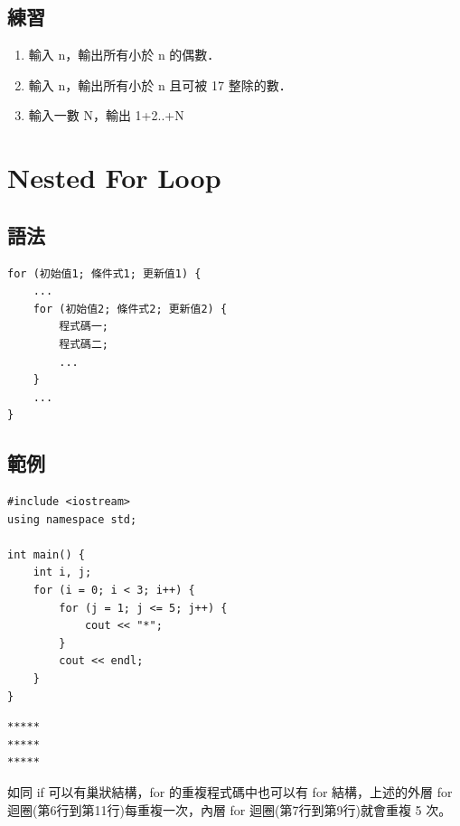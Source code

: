 \documentclass[a4paper,12pt]{article}
\begin{document}
\subsection{練習}
\label{sec:org10e17d3}
\begin{enumerate}
\item 輸入 n，輸出所有小於 n 的偶數．\\
\item 輸入 n，輸出所有小於 n 且可被 17 整除的數．\\
\item 輸入一數 N，輸出 1+2..+N\\
\end{enumerate}

\section{Nested For Loop}
\label{cpp_nested_for}
\subsection{語法}
\label{sec:org93131b2}
\lstset{breaklines=true,language=cpp,label= ,caption= ,captionpos=b,firstnumber=1,numbers=left}
\begin{lstlisting}
for (初始值1; 條件式1; 更新值1) {
    ...
    for (初始值2; 條件式2; 更新值2) {
        程式碼一;
        程式碼二;
        ...
    }
    ...
}
\end{lstlisting}
\subsection{範例}
\label{sec:org01c6e8f}
\lstset{breaklines=true,language=cpp,label= ,caption= ,captionpos=b,firstnumber=1,numbers=left}
\begin{lstlisting}
#include <iostream>
using namespace std;

int main() {
    int i, j;
    for (i = 0; i < 3; i++) {
        for (j = 1; j <= 5; j++) {
            cout << "*";
        }
        cout << endl;
    }
}
\end{lstlisting}

\begin{verbatim}
*****
*****
*****
\end{verbatim}


如同 if 可以有巢狀結構，for 的重複程式碼中也可以有 for 結構，上述的外層 for 迴圈(第6行到第11行)每重複一次，內層 for 迴圈(第7行到第9行)就會重複 5 次。\\
\end{document}
